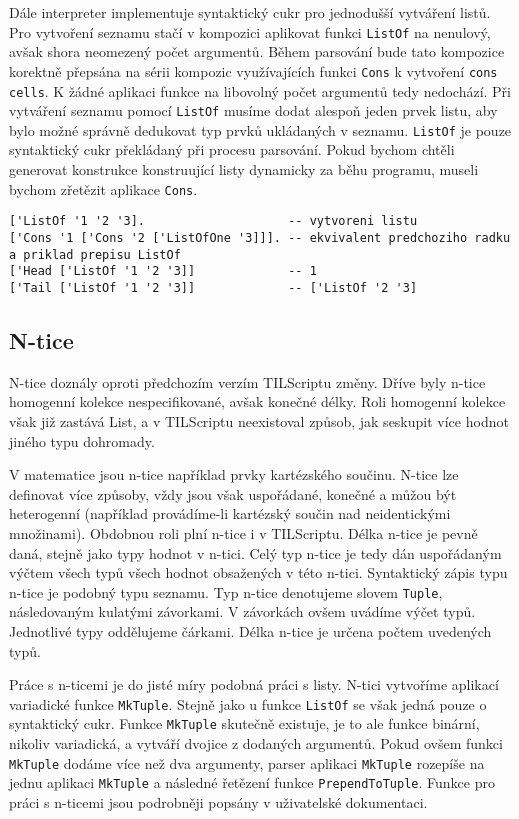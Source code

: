Dále interpreter implementuje syntaktický cukr pro jednodušší vytváření listů. Pro vytvoření
seznamu stačí v kompozici aplikovat funkci \lstinline{ListOf} na nenulový, avšak shora neomezený
počet argumentů. Během parsování bude tato kompozice korektně přepsána na sérii kompozic
využívajících funkci \lstinline{Cons} k vytvoření \lstinline{cons cells}. K žádné aplikaci funkce
na libovolný počet argumentů tedy nedochází. Při vytváření seznamu pomocí \lstinline{ListOf} musíme
dodat alespoň jeden prvek listu, aby bylo možné správně dedukovat typ prvků ukládaných v seznamu.
\lstinline{ListOf} je pouze syntaktický cukr překládaný při procesu parsování. Pokud bychom chtěli
generovat konstrukce konstruující listy dynamicky za běhu programu, museli bychom zřetězit aplikace
\lstinline{Cons}.

\begin{lstlisting}[caption={Příklad využití seznamů}]
['ListOf '1 '2 '3].                    -- vytvoreni listu
['Cons '1 ['Cons '2 ['ListOfOne '3]]]. -- ekvivalent predchoziho radku a priklad prepisu ListOf
['Head ['ListOf '1 '2 '3]]             -- 1
['Tail ['ListOf '1 '2 '3]]             -- ['ListOf '2 '3]
\end{lstlisting}

\subsection{N-tice}

N-tice doznály oproti předchozím verzím TILScriptu změny. Dříve byly n-tice homogenní kolekce
nespecifikované, avšak konečné délky. Roli homogenní kolekce však již zastává List, a v TILScriptu
neexistoval způsob, jak seskupit více hodnot jiného typu dohromady.

V matematice jsou n-tice například prvky kartézského součinu. N-tice lze definovat více způsoby,
vždy jsou však uspořádané, konečné a můžou být heterogenní (například provádíme-li kartézský součin
nad neidentickými množinami). Obdobnou roli plní n-tice i v TILScriptu. Délka n-tice je pevně daná,
stejně jako typy hodnot v n-tici. Celý typ n-tice je tedy dán uspořádaným výčtem všech typů všech
hodnot obsažených v této n-tici. Syntaktický zápis typu n-tice je podobný typu seznamu. Typ n-tice
denotujeme slovem \lstinline{Tuple}, následovaným kulatými závorkami. V závorkách ovšem uvádíme
výčet typů. Jednotlivé typy oddělujeme čárkami. Délka n-tice je určena počtem uvedených typů.

Práce s n-ticemi je do jisté míry podobná práci s listy. N-tici vytvoříme aplikací variadické
funkce \lstinline{MkTuple}. Stejně jako u funkce \lstinline{ListOf} se však jedná pouze o
syntaktický cukr. Funkce \lstinline{MkTuple} skutečně existuje, je to ale funkce binární, nikoliv
variadická, a vytváří dvojice z dodaných argumentů. Pokud ovšem funkci \lstinline{MkTuple} dodáme
více než dva argumenty, parser aplikaci \lstinline{MkTuple} rozepíše na jednu aplikaci
\lstinline{MkTuple} a následné řetězení funkce \lstinline{PrependToTuple}. Funkce pro práci
s n-ticemi jsou podrobněji popsány v uživatelské dokumentaci.
 
